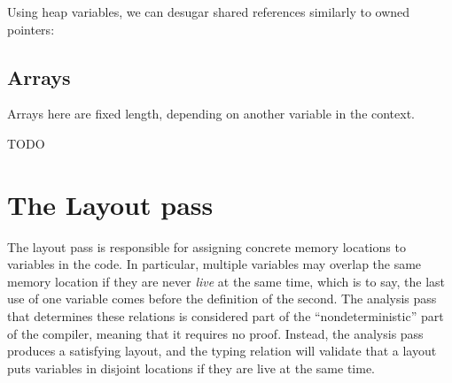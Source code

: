 \documentclass[acmsmall,nonacm]{acmart}
\DeclareMathOperator*{\Sep}{\scalerel*{\ast}{\sum}}
\newcommand*{\N}{\mathbb{N}}
\newcommand{\core}[1]{\left| #1 \right|}
\newcommand{\proves}{\vdash}
\begin{document}
Using heap variables, we can desugar shared references similarly to owned pointers:


\subsection{Arrays}\label{sec:arrays}

Arrays here are fixed length, depending on another variable in the context.


TODO

\section{The Layout pass}\label{sec:layout}

The layout pass is responsible for assigning concrete memory locations to variables in the code. In particular, multiple variables may overlap the same memory location if they are never \emph{live} at the same time, which is to say, the last use of one variable comes before the definition of the second. The analysis pass that determines these relations is considered part of the ``nondeterministic'' part of the compiler, meaning that it requires no proof. Instead, the analysis pass produces a satisfying layout, and the typing relation will validate that a layout puts variables in disjoint locations if they are live at the same time.
\end{document}
